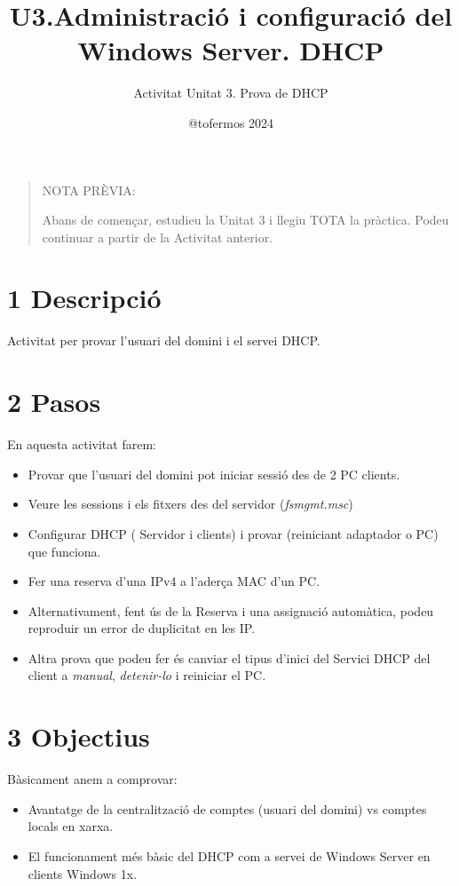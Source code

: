 \documentclass[
  a4paper,
]{article}
\title{U3.Administració i configuració del Windows Server. DHCP}
\subtitle{Activitat Unitat 3. Prova de DHCP}
\author{@tofermos 2024}
\date{}
\begin{document}
\maketitle

{
\setcounter{tocdepth}{2}
\tableofcontents
}
\newpage
\renewcommand\tablename{Tabla}

\begin{quote}
NOTA PRÈVIA:

Abans de començar, estudieu la Unitat 3 i llegiu TOTA la pràctica. Podeu
continuar a partir de la Activitat anterior.
\end{quote}

\section{1 Descripció}\label{descripciuxf3}

Activitat per provar l'usuari del domini i el servei DHCP.

\section{2 Pasos}\label{pasos}

En aquesta activitat farem:

\begin{itemize}
\item
  Provar que l'usuari del domini pot iniciar sessió des de 2 PC clients.
\item
  Veure les sessions i els fitxers des del servidor (\emph{fsmgmt.msc})
\item
  Configurar DHCP ( Servidor i clients) i provar (reiniciant adaptador o
  PC) que funciona.
\item
  Fer una reserva d'una IPv4 a l'aderça MAC d'un PC.
\item
  Alternativament, fent ús de la Reserva i una assignació automàtica,
  podeu reproduir un error de duplicitat en les IP.
\item
  Altra prova que podeu fer és canviar el tipus d'inici del Servici DHCP
  del client a \emph{manual}, \emph{detenir-lo} i reiniciar el PC.
\end{itemize}

\section{3 Objectius}\label{objectius}

Bàsicament anem a comprovar:

\begin{itemize}
\item
  Avantatge de la centralització de comptes (usuari del domini) vs
  comptes locals en xarxa.
\item
  El funcionament més bàsic del DHCP com a servei de Windows Server en
  clients Windows 1x.
\end{itemize}
\end{document}

